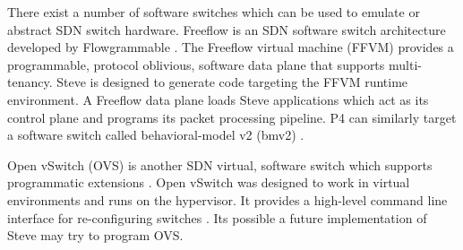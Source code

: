 There exist a number of software switches which can be used to emulate or abstract SDN switch hardware.
Freeflow is an SDN software switch architecture developed
by Flowgrammable \cite{freeflow_software}. The Freeflow virtual machine (FFVM) 
provides a programmable, protocol oblivious, software data plane that 
supports multi-tenancy. Steve is
designed to generate code targeting the FFVM runtime environment. A Freeflow data 
plane loads Steve applications which act as its control plane and programs its packet processing pipeline.
P4 can similarly target a software switch called behavioral-model v2 (bmv2) \cite{bmv2_software}. 

Open vSwitch (OVS) is another SDN virtual, software switch which supports programmatic extensions \cite{ovs_man_page, ovs2009extending, ovs2013}. Open vSwitch was designed to work in virtual environments and runs on the hypervisor. It provides a high-level command line interface for re-configuring switches \cite{ovs_man_page}. Its possible a future implementation of Steve may try to program OVS. 




